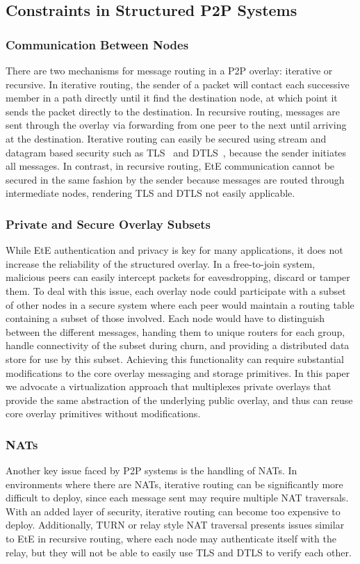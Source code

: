\documentclass[conference]{IEEEtran}
\begin{document}
\subsection{Constraints in Structured P2P Systems}
\subsubsection{Communication Between Nodes}
There are two mechanisms for message routing in a P2P overlay: iterative or
recursive.  In iterative routing, the sender of a packet will contact each
successive member in a path directly until it find the destination node, at
which point it sends the packet directly to the destination.  In recursive
routing, messages are sent through the overlay via forwarding from one peer to
the next until arriving at the destination.  Iterative routing can easily be
secured using stream and datagram based security such as TLS~\cite{tls} and
DTLS~\cite{dtls}, because the sender initiates all messages.  In contrast, in recursive routing, 
EtE communication cannot be secured in the same fashion by the sender because 
messages are routed through intermediate nodes, rendering TLS and DTLS not
easily applicable.

\subsubsection{Private and Secure Overlay Subsets}
While EtE authentication and privacy is key for many applications, it does not increase the reliability of the structured
overlay.  In a free-to-join system, malicious peers can easily intercept packets
for eavesdropping, discard or tamper them.  To deal with
this issue, each overlay node could participate with a subset of other nodes in
a secure system where each peer would maintain a routing table containing a subset
of those involved.  Each node would have to distinguish between the different
messages, handing them to unique routers for each group, handle connectivity
of the subset during churn, and providing a distributed data store for use by this subset.
Achieving this functionality can require substantial modifications to the core overlay
messaging and storage primitives. In this paper we advocate a virtualization approach
that multiplexes private overlays that provide the same abstraction of the underlying
public overlay, and thus can reuse core overlay primitives without modifications.

\subsubsection{NATs}
Another key issue faced by P2P systems is the handling of NATs.  In environments
where there are NATs, iterative routing can be significantly more difficult to
deploy, since each message sent may require multiple NAT traversals.  With an
added layer of security, iterative routing can become too expensive to
deploy.   Additionally, TURN or relay style NAT traversal presents issues
similar to EtE in recursive routing, where each node may authenticate
itself with the relay, but they will not be able to easily use TLS and DTLS to
verify each other.
\end{document}

